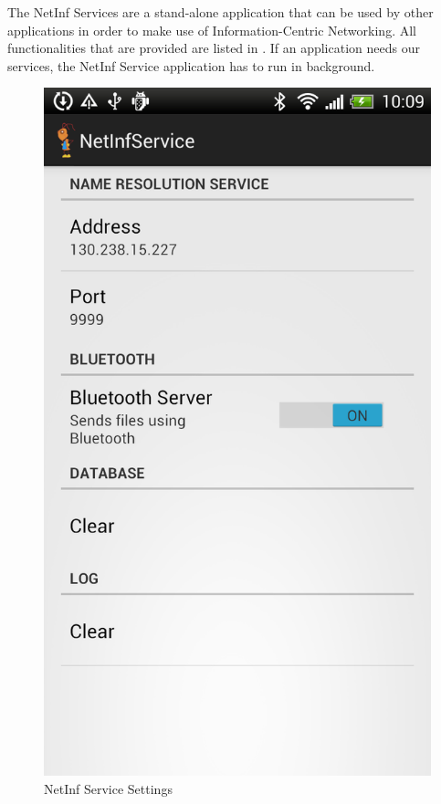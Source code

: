 The NetInf Services are a stand-alone application that can be used by other
applications in order to make use of Information-Centric Networking. All functionalities
that are provided are listed in . If an application
needs our services, the NetInf Service application has to run in background.

\begin{figure}
\centering
\includegraphics[scale=0.15]{img/ant_settings.png}
\caption{NetInf Service Settings}\label{fig:servicesettings}
\end{figure}

